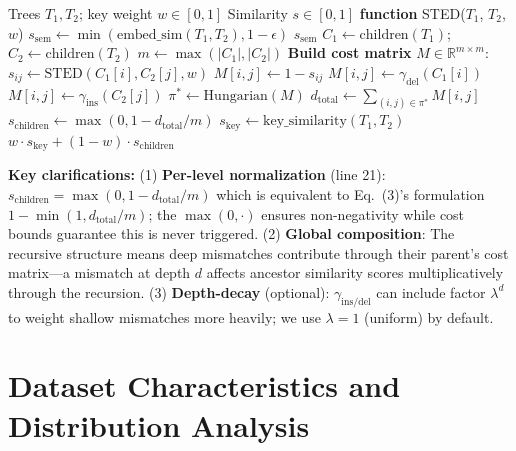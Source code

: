 \documentclass{article}
\theoremstyle{plain}
\theoremstyle{definition}
\begin{document}
\begin{algorithm}[h]
\caption{STED: Semantic Tree Edit Distance}
\label{alg:sted}
\begin{algorithmic}[1]
\REQUIRE Trees $T_1, T_2$; key weight $w \in [0,1]$
\ENSURE Similarity $s \in [0,1]$
\STATE \textbf{function} STED($T_1$, $T_2$, $w$)
         
    \ELSE
        \STATE $s_{\text{sem}} \gets \min(\text{embed\_sim}(T_1, T_2), 1-\epsilon)$
        \RETURN $s_{\text{sem}}$ 
    \ENDIF
\ENDIF
\STATE $C_1 \gets \text{children}(T_1)$; $C_2 \gets \text{children}(T_2)$
\STATE $m \gets \max(|C_1|, |C_2|)$
\STATE \textbf{Build cost matrix} $M \in \mathbb{R}^{m \times m}$:
    \STATE $s_{ij} \gets \text{STED}(C_1[i], C_2[j], w)$ 
    \STATE $M[i,j] \gets 1 - s_{ij}$ 
\ENDFOR
{}
    \STATE $M[i,j] \gets \gamma_{\text{del}}(C_1[i])$ 
\ENDFOR
{}
    \STATE $M[i,j] \gets \gamma_{\text{ins}}(C_2[j])$ 
\ENDFOR
\STATE $\pi^* \gets \text{Hungarian}(M)$ 
\STATE $d_{\text{total}} \gets \sum_{(i,j) \in \pi^*} M[i,j]$
\STATE $s_{\text{children}} \gets \max(0, 1 - d_{\text{total}} / m)$ 
\STATE $s_{\text{key}} \gets \text{key\_similarity}(T_1, T_2)$ 
\RETURN $w \cdot s_{\text{key}} + (1-w) \cdot s_{\text{children}}$
\end{algorithmic}
\end{algorithm}

\textbf{Key clarifications:} (1) \textbf{Per-level normalization} (line 21): $s_{\text{children}} = \max(0, 1 - d_{\text{total}}/m)$ which is equivalent to Eq.~(3)'s formulation $1 - \min(1, d_{\text{total}}/m)$; the $\max(0,\cdot)$ ensures non-negativity while cost bounds guarantee this is never triggered. (2) \textbf{Global composition}: The recursive structure means deep mismatches contribute through their parent's cost matrix---a mismatch at depth $d$ affects ancestor similarity scores multiplicatively through the recursion. (3) \textbf{Depth-decay} (optional): $\gamma_{\text{ins/del}}$ can include factor $\lambda^d$ to weight shallow mismatches more heavily; we use $\lambda=1$ (uniform) by default.

\section{Dataset Characteristics and Distribution Analysis}
\label{sec:dataset-distribution}
\end{document}
